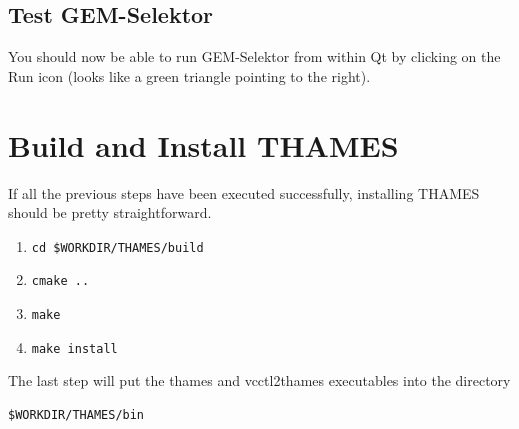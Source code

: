 \documentclass{article}
\begin{document}
\subsection{Test GEM-Selektor}
You should now be able to run GEM-Selektor from within Qt by clicking on the Run icon (looks
like a green triangle pointing to the right). 

\section{Build and Install THAMES}
If all the previous steps have been executed successfully, installing THAMES should be pretty
straightforward.
\begin{enumerate}
    \item \verb!cd $WORKDIR/THAMES/build!
    \item \verb!cmake ..!
    \item \verb!make!
    \item \verb!make install!
\end{enumerate}
The last step will put the thames and vcctl2thames executables into the directory
\begin{verbatim}
$WORKDIR/THAMES/bin
\end{verbatim}
\end{document}
